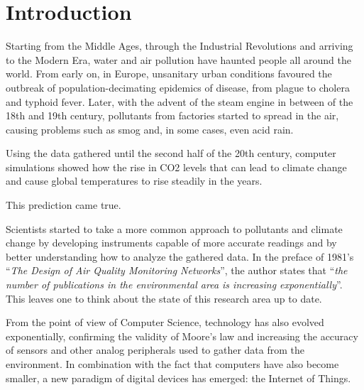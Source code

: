 

\chapter{Introduction}\label{chapter:introduction}


	Starting from the Middle Ages, through the Industrial Revolutions and arriving to the Modern Era, water and air pollution have haunted people all around the world.
	From early on, in Europe, unsanitary urban conditions favoured the outbreak of population-decimating epidemics of disease, from plague to cholera and typhoid fever.
	Later, with the advent of the steam engine in between of the 18th and 19th century, pollutants from factories started to spread in the air, causing problems such as smog and, in some cases, even acid rain.
	
	Using the data gathered until the second half of the 20th century, computer simulations showed how the rise in CO2 levels that can lead to climate change and cause global temperatures to rise steadily in the years.
	
	This prediction came true.

	Scientists started to take a more common approach to pollutants and climate change by developing instruments capable of more accurate readings and by better understanding how to analyze the gathered data.
	In the preface of 1981's ``\textit{The Design of Air Quality Monitoring Networks}'', the author states that ``\textit{the number of publications in the environmental area is increasing exponentially}''\cite{airqualitynetworks}.
	This leaves one to think about the state of this research area up to date.
	
	From the point of view of Computer Science, technology has also evolved exponentially, confirming the validity of Moore's law and increasing the accuracy of sensors and other analog peripherals used to gather data from the environment.
	In combination with the fact that computers have also become smaller, a new paradigm of digital devices has emerged: the Internet of Things.
		
